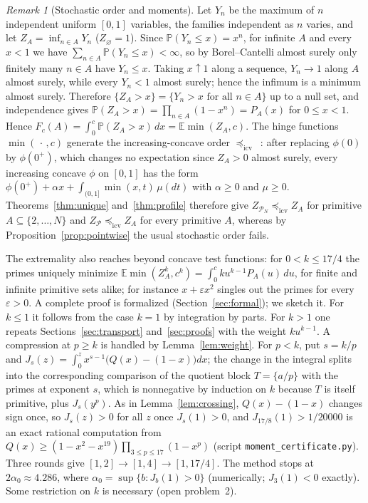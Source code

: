 \documentclass[11pt]{article}
\theoremstyle{remark}
\newtheorem{remark}[theorem]{Remark}
\newcommand{\Prm}{\mathcal{P}}
\newcommand{\E}{\mathbb{E}}
\newcommand{\Prob}{\mathbb{P}}
\newcommand{\icv}{\preceq_{\mathrm{icv}}}
\begin{document}
\begin{remark}[Stochastic order and moments]\label{rem:icv}
Let $Y_n$ be the maximum of $n$ independent uniform $[0,1]$ variables,
the families independent as $n$ varies, and let $Z_A=\inf_{n\in A}Y_n$
($Z_\varnothing=1$). Since $\Prob(Y_n\le x)=x^n$, for infinite $A$ and
every $x<1$ we have $\sum_{n\in A}\Prob(Y_n\le x)<\infty$, so by
Borel--Cantelli almost surely only finitely many $n\in A$ have
$Y_n\le x$. Taking $x\uparrow1$ along a sequence, $Y_n\to1$ along $A$
almost surely, while every $Y_n<1$ almost surely; hence the infimum is
a minimum almost surely. Therefore $\{Z_A>x\}=\{Y_n>x\text{ for all }n\in A\}$
up to a null set, and independence gives
$\Prob(Z_A>x)=\prod_{n\in A}(1-x^n)=P_A(x)$ for $0\le x<1$. Hence
$F_c(A)=\int_0^c\Prob(Z_A>x)\,dx=\E\min(Z_A,c)$. The hinge functions $\min(\,\cdot\,,c)$
generate the increasing-concave order $\icv$~\cite{ShakedShanthikumar}:
after replacing $\phi(0)$ by $\phi(0^+)$, which changes no expectation
since $Z_A>0$ almost surely, every increasing concave $\phi$ on $[0,1]$
has the form $\phi(0^+)+\alpha x+\int_{(0,1]}\min(x,t)\,\mu(dt)$ with
$\alpha\ge0$ and $\mu\ge0$. Theorems~\ref{thm:unique}
and~\ref{thm:profile} therefore give $Z_{\Prm_N}\icv Z_A$ for primitive
$A\subseteq\{2,\dots,N\}$ and $Z_\Prm\icv Z_A$ for every primitive $A$,
whereas by Proposition~\ref{prop:pointwise} the usual stochastic order
fails.

The extremality also reaches beyond concave test functions: for
$0<k\le17/4$ the primes uniquely minimize
$\E\min(Z_A^k,c^k)=\int_0^cku^{k-1}P_A(u)\,du$, for finite and infinite
primitive sets alike; for instance $x+\varepsilon x^2$ singles out the
primes for every $\varepsilon>0$. A complete proof is formalized
(Section~\ref{sec:formal}); we sketch it. For $k\le1$ it follows from
the case $k=1$ by integration by parts. For $k>1$ one repeats
Sections~\ref{sec:transport} and~\ref{sec:proofs} with the weight
$ku^{k-1}$. A compression at $p\ge k$ is handled by
Lemma~\ref{lem:weight}. For $p<k$, put $s=k/p$ and
$J_s(z)=\int_0^zx^{s-1}\bigl(Q(x)-(1-x)\bigr)dx$; the change in the
integral splits into the corresponding comparison of the quotient block
$T=\{a/p\}$ with the primes at exponent $s$, which is nonnegative by
induction on $k$ because $T$ is itself primitive, plus $J_s(y^p)$. As in
Lemma~\ref{lem:crossing}, $Q(x)-(1-x)$ changes sign once, so
$J_s(z)>0$ for all $z$ once $J_s(1)>0$, and $J_{17/8}(1)>1/20000$ is an
exact rational computation from
$Q(x)\ge(1-x^2-x^{19})\prod_{3\le p\le17}(1-x^p)$ (script
\texttt{moment\_certificate.py}). Three rounds give
$[1,2]\to[1,4]\to[1,17/4]$. The method stops at
$2\alpha_0\approx4.286$, where $\alpha_0=\sup\{b:J_b(1)>0\}$
(numerically; $J_3(1)<0$ exactly). Some restriction on $k$ is
necessary (open problem~2).
\end{remark}
\end{document}

